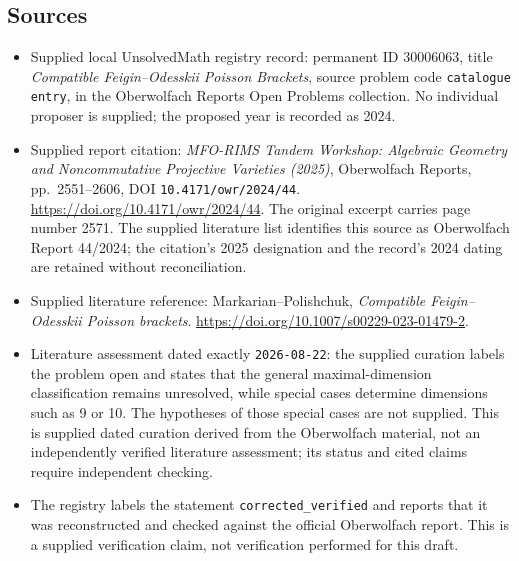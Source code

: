 \documentclass[11pt]{article}
\begin{document}
\subsection{Sources}
\begin{itemize}
\item Supplied local UnsolvedMath registry record: permanent ID \(30006063\), title \emph{Compatible Feigin--Odesskii Poisson Brackets}, source problem code \texttt{catalogue entry}, in the Oberwolfach Reports Open Problems collection. No individual proposer is supplied; the proposed year is recorded as 2024.
\item Supplied report citation: \emph{MFO-RIMS Tandem Workshop: Algebraic Geometry and Noncommutative Projective Varieties (2025)}, Oberwolfach Reports, pp.\ 2551--2606, DOI \texttt{10.4171/owr/2024/44}. \url{https://doi.org/10.4171/owr/2024/44}. The original excerpt carries page number 2571. The supplied literature list identifies this source as Oberwolfach Report 44/2024; the citation's 2025 designation and the record's 2024 dating are retained without reconciliation.
\item Supplied literature reference: Markarian--Polishchuk, \emph{Compatible Feigin--Odesskii Poisson brackets}. \url{https://doi.org/10.1007/s00229-023-01479-2}.
\item Literature assessment dated exactly \texttt{2026-08-22}: the supplied curation labels the problem open and states that the general maximal-dimension classification remains unresolved, while special cases determine dimensions such as 9 or 10. The hypotheses of those special cases are not supplied. This is supplied dated curation derived from the Oberwolfach material, not an independently verified literature assessment; its status and cited claims require independent checking.
\item The registry labels the statement \texttt{corrected\_verified} and reports that it was reconstructed and checked against the official Oberwolfach report. This is a supplied verification claim, not verification performed for this draft.
\end{itemize}
\end{document}
